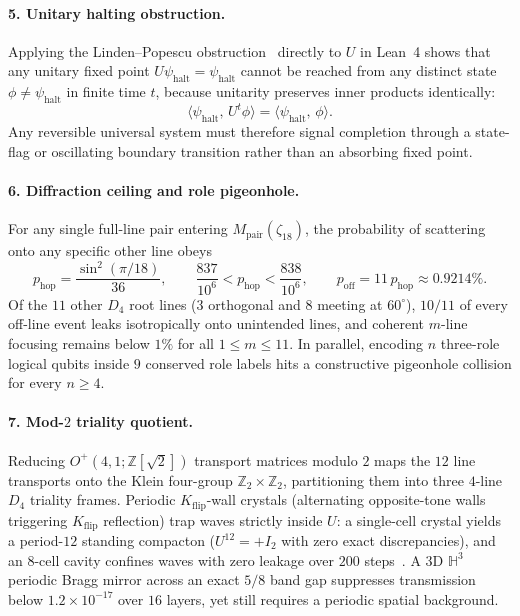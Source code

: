 \paragraph{5. Unitary halting obstruction.}
Applying the Linden--Popescu obstruction~\cite{linden1998} directly to $U$ in Lean~4 shows that any unitary fixed point $U \psi_{\mathrm{halt}} = \psi_{\mathrm{halt}}$ cannot be reached from any distinct state $\phi \neq \psi_{\mathrm{halt}}$ in finite time $t$, because unitarity preserves inner products identically:
\begin{equation}
\label{eq:halting-nogo}
\langle \psi_{\mathrm{halt}},\, U^t \phi \rangle = \langle \psi_{\mathrm{halt}},\, \phi \rangle.
\end{equation}
Any reversible universal system must therefore signal completion through a state-flag or oscillating boundary transition rather than an absorbing fixed point.

\paragraph{6. Diffraction ceiling and role pigeonhole.}
For any single full-line pair entering $M_{\mathrm{pair}}(\zeta_{18})$, the probability of scattering onto any specific other line obeys
\begin{equation}
\label{eq:mpair-cap}
p_{\mathrm{hop}} = \frac{\sin^2(\pi/18)}{36}, \qquad \frac{837}{10^6} < p_{\mathrm{hop}} < \frac{838}{10^6}, \qquad p_{\mathrm{off}} = 11\,p_{\mathrm{hop}} \approx 0.9214\%.
\end{equation}
Of the $11$ other $D_4$ root lines ($3$ orthogonal and $8$ meeting at $60^\circ$), $10/11$ of every off-line event leaks isotropically onto unintended lines, and coherent $m$-line focusing remains below $1\%$ for all $1 \le m \le 11$. In parallel, encoding $n$ three-role logical qubits inside $9$ conserved role labels hits a constructive pigeonhole collision for every $n \ge 4$.

\paragraph{7. Mod-$2$ triality quotient.}
Reducing $O^+(4,1;\mathbb{Z}[\sqrt{2}])$ transport matrices modulo $2$ maps the $12$ line transports onto the Klein four-group $\mathbb{Z}_2 \times \mathbb{Z}_2$, partitioning them into three $4$-line $D_4$ triality frames. Periodic $K_{\mathrm{flip}}$-wall crystals (alternating opposite-tone walls triggering $K_{\mathrm{flip}}$ reflection) trap waves strictly inside $U$: a single-cell crystal yields a period-$12$ standing compacton ($U^{12} = +I_2$ with zero exact discrepancies), and an $8$-cell cavity confines waves with zero leakage over $200$ steps~\cite{pollard2026repo}. A $3\mathrm{D}$ $\mathbb{H}^3$ periodic Bragg mirror across an exact $5/8$ band gap suppresses transmission below $1.2 \times 10^{-17}$ over $16$ layers, yet still requires a periodic spatial background.

